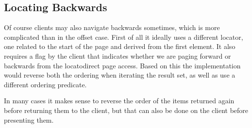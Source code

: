 \documentclass[11pt,a4paper]{article}
\begin{document}
\begin{multicols}{2}

\section*{Locating Backwards}

Of course clients may also navigate backwards sometimes, which is more
complicated than in the offset case. First of all it ideally uses a different
locator, one related to the start of the page and derived from the first
element. It also requires a flag by the client that indicates whether we are
paging forward or backwards from the locatodirect page access. Based on this the
implementation would reverse both the ordering when iterating the result set, as
well as use a different ordering predicate. %

In many cases it makes sense to reverse the
order of the items returned again before returning them to the client, but that
can also be done on the client before presenting them. 





\end{multicols}
\end{document}
